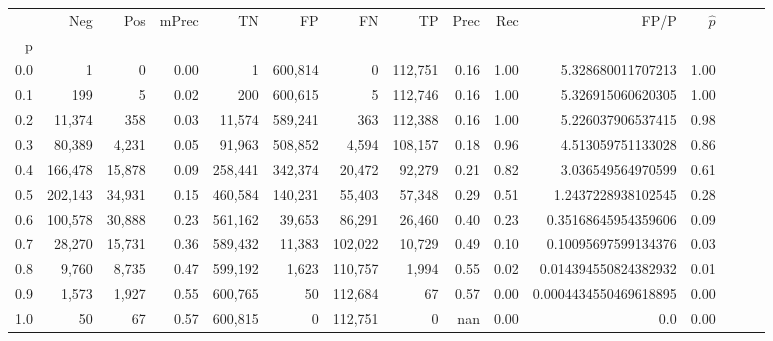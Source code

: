 \begin{tabular}{rrrrrrrrrrrrrrr}
\toprule
{} &      Neg &     Pos & mPrec &       TN &       FP &       FN &       TP &  Prec &   Rec &                   FP/P & $\hat{p}$ \\
p   &          &         &       &          &          &          &          &       &       &                        &           \\
\midrule
0.0 &        1 &       0 &  0.00 &        1 &  600,814 &        0 &  112,751 &  0.16 &  1.00 &      5.328680011707213 &      1.00 \\
0.1 &      199 &       5 &  0.02 &      200 &  600,615 &        5 &  112,746 &  0.16 &  1.00 &      5.326915060620305 &      1.00 \\
0.2 &   11,374 &     358 &  0.03 &   11,574 &  589,241 &      363 &  112,388 &  0.16 &  1.00 &      5.226037906537415 &      0.98 \\
0.3 &   80,389 &   4,231 &  0.05 &   91,963 &  508,852 &    4,594 &  108,157 &  0.18 &  0.96 &      4.513059751133028 &      0.86 \\
0.4 &  166,478 &  15,878 &  0.09 &  258,441 &  342,374 &   20,472 &   92,279 &  0.21 &  0.82 &      3.036549564970599 &      0.61 \\
0.5 &  202,143 &  34,931 &  0.15 &  460,584 &  140,231 &   55,403 &   57,348 &  0.29 &  0.51 &     1.2437228938102545 &      0.28 \\
0.6 &  100,578 &  30,888 &  0.23 &  561,162 &   39,653 &   86,291 &   26,460 &  0.40 &  0.23 &    0.35168645954359606 &      0.09 \\
0.7 &   28,270 &  15,731 &  0.36 &  589,432 &   11,383 &  102,022 &   10,729 &  0.49 &  0.10 &    0.10095697599134376 &      0.03 \\
0.8 &    9,760 &   8,735 &  0.47 &  599,192 &    1,623 &  110,757 &    1,994 &  0.55 &  0.02 &   0.014394550824382932 &      0.01 \\
0.9 &    1,573 &   1,927 &  0.55 &  600,765 &       50 &  112,684 &       67 &  0.57 &  0.00 &  0.0004434550469618895 &      0.00 \\
1.0 &       50 &      67 &  0.57 &  600,815 &        0 &  112,751 &        0 &   nan &  0.00 &                    0.0 &      0.00 \\
\bottomrule
\end{tabular}
